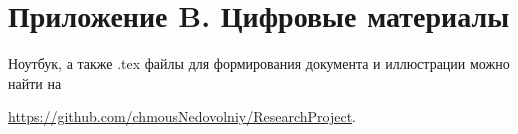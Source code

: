 \documentclass{article}
\begin{document}
\section*{Приложение B. Цифровые материалы}
Ноутбук, а также .tex файлы для формирования документа и иллюстрации можно найти на

\url{https://github.com/chmousNedovolniy/ResearchProject}.
\end{document}
